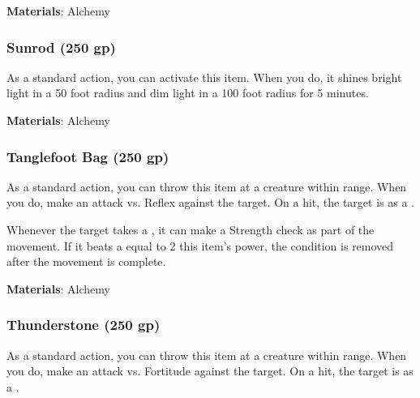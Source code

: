 \vspace{0.25em}
\textbf{Materials}: Alchemy


\lowercase{\hypertarget{item:Sunrod}{}}\label{item:Sunrod}
\hypertarget{item:Sunrod}{\subsubsection{Sunrod\hfill{} (250 gp)}}

As a standard action, you can activate this item.
When you do, it shines bright light in a 50 foot radius and dim light in a 100 foot radius for 5 minutes.



\vspace{0.25em}
\textbf{Materials}: Alchemy


\lowercase{\hypertarget{item:Tanglefoot Bag}{}}\label{item:Tanglefoot Bag}
\hypertarget{item:Tanglefoot Bag}{\subsubsection{Tanglefoot Bag\hfill{} (250 gp)}}

As a standard action, you can throw this item at a creature within \rngclose range.
When you do, make an attack vs. Reflex against the target.
On a hit, the target is  as a .

Whenever the target takes a , it can make a Strength check as part of the movement.
If it beats a  equal to 2 \add this item's power, the condition is removed after the movement is complete.



\vspace{0.25em}
\textbf{Materials}: Alchemy


\lowercase{\hypertarget{item:Thunderstone}{}}\label{item:Thunderstone}
\hypertarget{item:Thunderstone}{\subsubsection{Thunderstone\hfill{} (250 gp)}}

As a standard action, you can throw this item at a creature within \rngclose range.
When you do, make an attack vs. Fortitude against the target.
On a hit, the target is  as a .



